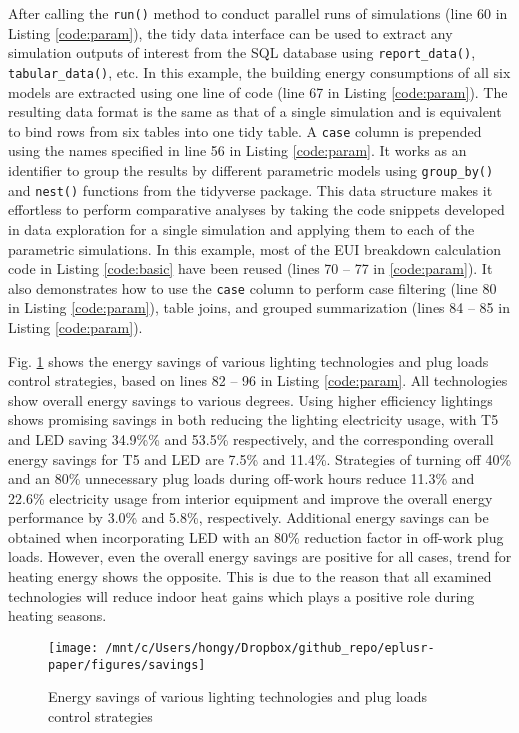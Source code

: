 \documentclass[3p, times]{elsarticle} %
\begin{document}
After calling the \texttt{run()} method to conduct parallel runs of simulations (line
60 in Listing \ref{code:param}), the tidy data interface can be used to
extract any simulation outputs of interest from the SQL database using
\texttt{report\_data()}, \texttt{tabular\_data()}, etc.
In this example, the building energy consumptions of all six
models are extracted using one line of code (line 67 in Listing \ref{code:param}).
The resulting data format is the same as that of a single simulation and is
equivalent to bind rows from six tables into one tidy table.
A \texttt{case} column is prepended using the names specified in line 56 in Listing
\ref{code:param}.
It works as an identifier to group the results by different parametric models
using \texttt{group\_by()} and \texttt{nest()} functions from the tidyverse package.
This data structure makes it effortless to perform comparative analyses by
taking the code snippets developed in data exploration for a single simulation
and applying them to each of the parametric simulations.
In this example, most of the EUI breakdown calculation code in Listing
\ref{code:basic} have been reused (lines 70 -- 77 in \ref{code:param}).
It also demonstrates how to use the \texttt{case} column to perform case filtering
(line 80 in Listing \ref{code:param}), table joins, and grouped summarization
(lines 84 -- 85 in Listing \ref{code:param}).

Fig. \ref{fig:savings} shows the energy savings of various lighting
technologies and plug loads control strategies, based on lines 82 -- 96 in
Listing \ref{code:param}. All technologies show overall energy savings to
various degrees. Using higher efficiency lightings shows promising
savings in both reducing the lighting electricity usage, with T5 and LED saving
34.9\%\% and 53.5\% respectively, and the corresponding overall energy savings for
T5 and LED are 7.5\% and 11.4\%. Strategies of turning off 40\% and an 80\%
unnecessary plug loads during off-work hours reduce 11.3\% and 22.6\% electricity
usage from interior equipment and improve the overall energy performance by
3.0\% and 5.8\%, respectively. Additional energy savings can be obtained when
incorporating LED with an 80\% reduction factor in off-work plug loads. However,
even the overall energy savings are positive for all cases, trend for
heating energy shows the opposite. This is due to the reason that all examined
technologies will reduce indoor heat gains which plays a positive role during
heating seasons.

\begin{figure}[!htb]
\texttt{[image: /mnt/c/Users/hongy/Dropbox/github\_repo/eplusr-paper/figures/savings]} \caption{Energy savings of various lighting technologies and plug loads control strategies}\label{fig:savings}
\end{figure}
\end{document}
